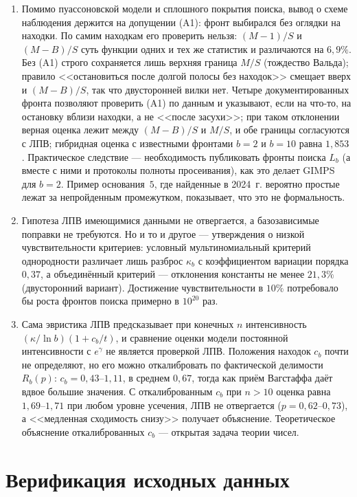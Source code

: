 \documentclass[11pt,a4paper]{article}
\theoremstyle{plain}
\theoremstyle{remark}
\newcommand{\Rb}{R_b}
\newcommand{\eg}{e^{\gamma}}
\begin{document}
\begin{enumerate}
\item Помимо пуассоновской модели и сплошного покрытия поиска, вывод о схеме
наблюдения держится на допущении (A1): фронт выбирался без оглядки на находки. По
самим находкам его проверить нельзя: $(M-1)/S$ и $(M-B)/S$ суть функции одних и тех
же статистик и различаются на $6{,}9\%$. Без (A1) строго сохраняется лишь верхняя
граница $M/S$ (тождество Вальда); правило <<остановиться после долгой полосы без
находок>> смещает вверх и $(M-B)/S$, так что двусторонней вилки нет. Четыре
документированных фронта позволяют проверить (A1) по данным и указывают, если на
что-то, на остановку вблизи находки, а не <<после засухи>>; при таком отклонении
верная оценка лежит между $(M-B)/S$ и $M/S$, и обе границы согласуются с ЛПВ;
гибридная оценка с известными фронтами $b=2$ и $b=10$ равна
$1{,}853$. Практическое следствие --- необходимость публиковать фронты поиска $L_b$
(а вместе с ними и протоколы полноты просеивания), как это делает GIMPS для $b=2$.
Пример основания~$5$, где найденные в 2024~г. вероятно простые лежат за
непройденным промежутком, показывает, что это не формальность.

\item Гипотеза ЛПВ имеющимися данными не отвергается, а базозависимые поправки не
требуются. Но и то и другое --- утверждения о низкой чувствительности критериев:
условный мультиномиальный критерий однородности различает лишь разброс $\kappa_b$
с коэффициентом вариации порядка $0{,}37$, а объединённый критерий --- отклонения
константы не менее
$21{,}3\%$ (двусторонний вариант). Достижение чувствительности в $10\%$ потребовало
бы роста фронтов поиска примерно в $10^{20}$ раз.

\item Сама эвристика ЛПВ предсказывает при конечных $n$ интенсивность
$(\kappa/\ln b)(1+c_b/t)$, и сравнение оценки модели постоянной интенсивности с
$\eg$ не является проверкой ЛПВ. Положения находок $c_b$ почти не определяют, но
его можно откалибровать по фактической делимости $\Rb(p)$: $c_b=0{,}43$--$1{,}11$,
в среднем $0{,}67$, тогда как приём Вагстаффа даёт вдвое большие значения. С
откалиброванным $c_b$ при $n>10$ оценка равна $1{,}69$--$1{,}71$ при любом уровне
усечения, ЛПВ не отвергается ($p=0{,}62$--$0{,}73$), а <<медленная сходимость
снизу>> получает объяснение. Теоретическое объяснение откалиброванных $c_b$ --- открытая
задача теории чисел.
\end{enumerate}


\appendix
\section{Верификация исходных данных}\label{app:data}
\end{document}
